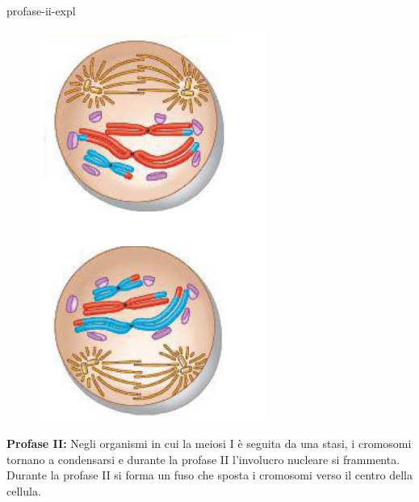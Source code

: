 \documentclass[preview]{standalone}
\begin{document}
\begin{snippet}{profase-ii-expl}
    \setlength{\intextsep}{0pt}%
    \begin{figure}
        \includegraphics[width=7.5cm]{./resources/profase-ii.png}
        \vspace{-1cm}
    \end{figure}

    \textbf{Profase II:}
    Negli organismi in cui la meiosi I è seguita da una stasi, i cromosomi tornano a condensarsi
    e durante la profase II l'involucro nucleare si frammenta. Durante la profase II si forma un
    fuso che sposta i cromosomi verso il centro della cellula.
    \wrapfill
\end{snippet}
\end{document}

